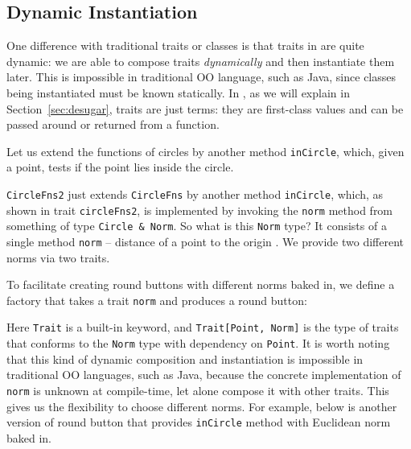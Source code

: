 \subsection{Dynamic Instantiation}

One difference with traditional traits or classes is that traits in \name are
quite dynamic: we are able to compose traits \textit{dynamically} and then
instantiate them later. This is impossible in traditional OO language, such as
Java, since classes being instantiated must be known statically. In \name, as we
will explain in Section~\ref{sec:desugar}, traits are just terms: they are
first-class values and can be passed around or returned from a function.

Let us extend the functions of circles by another method \lstinline{inCircle},
which, given a point, tests if the point lies inside the circle.

\lstinline{CircleFns2} just extends \lstinline{CircleFns} by another method
\lstinline{inCircle}, which, as shown in trait \lstinline{circleFns2}, is
implemented by invoking the \lstinline{norm} method from something of type
\lstinline{Circle & Norm}. So what is this \lstinline{Norm} type? It consists of
a single method \lstinline{norm} -- distance of a point to the origin . We
provide two different norms via two traits.

To facilitate creating round buttons with different norms baked in, we define a
factory that takes a trait \lstinline$norm$ and produces a round button:

Here \lstinline{Trait} is a built-in keyword, and \lstinline$Trait[Point, Norm]$
is the type of traits that conforms to the \lstinline$Norm$ type with dependency
on \lstinline{Point}. It is worth noting that this kind of dynamic composition
and instantiation is impossible in traditional OO languages, such as Java,
because the concrete implementation of \lstinline{norm} is unknown at
compile-time, let alone compose it with other traits. This gives us the
flexibility to choose different norms. For example, below is another version of
round button that provides \lstinline{inCircle} method with Euclidean norm baked
in.



